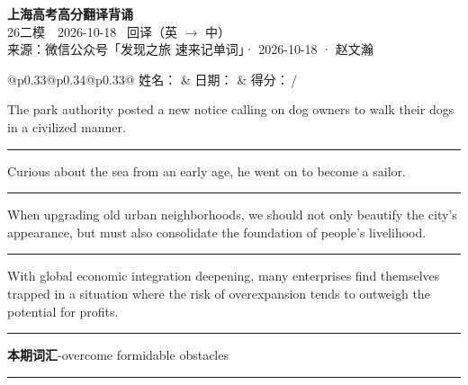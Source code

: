 \documentclass[11pt,a4paper]{article}
\newcommand{\num}[1]{\makebox[1.9em][r]{#1.}\hspace{0.3em}}
\newcommand{\wline}{\noindent\rule{\linewidth}{0.4pt}}
\begin{document}
\pagestyle{plain}
\begin{center}
{\LARGE\bfseries 上海高考高分翻译背诵 }\\[0.25em]
{\large 26二模　2026-10-18 \quad\ 回译（英 $\to$ 中）}\\[0.35em]
{\footnotesize 来源：微信公众号「发现之旅 速来记单词」· 2026-10-18 · 赵文瀚}
\end{center}

\vspace{0.4em}
\noindent\begin{tabular}{@{}p{0.33\textwidth}@{}p{0.34\textwidth}@{}p{0.33\textwidth}@{}}
姓名：\underline{\hspace{2.0cm}} & 日期：\underline{\hspace{2.0cm}} & 得分：\underline{\hspace{1.4cm}}\,/ \\
\end{tabular}

\vspace{0.5em}

\vspace{0.8em}
\num{1}The park authority posted a new notice calling on dog owners to walk their dogs in a civilized manner.

\vspace{0.25em}

\wline

\num{2}Curious about the sea from an early age, he went on to become a sailor.

\vspace{0.25em}

\wline

\num{3}When upgrading old urban neighborhoods, we should not only beautify the city’s appearance, but must also consolidate the foundation of people’s livelihood.

\vspace{0.25em}

\wline

\num{4}With global economic integration deepening, many enterprises find themselves trapped in a situation where the risk of overexpansion tends to outweigh the potential for profits.

\vspace{0.25em}

\wline

\vspace{0.4em}\noindent{\color{rulegray}\rule{\textwidth}{0.6pt}}\vspace{0.4em}

\num{5}\textbf{本期词汇}\quad -overcome formidable obstacles

\vspace{0.25em}

\wline
\end{document}
